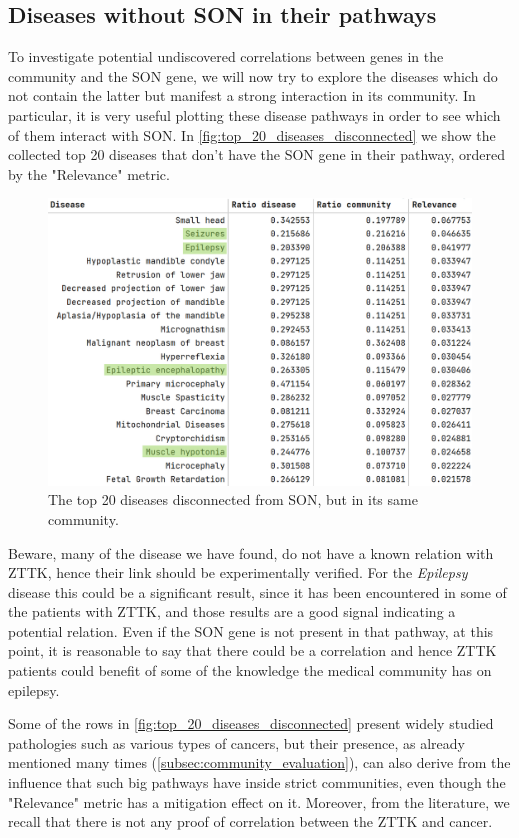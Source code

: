 \subsection{Diseases without SON in their pathways}\label{subsec:diseases_no_son}
To investigate potential undiscovered correlations between genes in the community and the SON gene, we will now try to explore the diseases which do not contain the latter but manifest a strong interaction in its community. In particular, it is very useful plotting these disease pathways in order to see which of them interact with SON. In \autoref{fig:top_20_diseases_disconnected} we show the collected top 20 diseases that don't have the SON gene in their pathway, ordered by the "Relevance" metric.
\begin{figure}[H]
    \centering
    \includegraphics[width=0.8\linewidth]{images/top20_diseases_disconnected_highlighted.png}
    \caption{The top 20 diseases disconnected from SON, but in its same community.}
    \label{fig:top_20_diseases_disconnected}
\end{figure}
Beware, many of the disease we have found, do not have a known relation with ZTTK, hence their link should be experimentally verified. For the \textit{Epilepsy} disease this could be a significant result, since it has been encountered in some of the patients with ZTTK, and those results are a good signal indicating a potential relation. Even if the SON gene is not present in that pathway, at this point, it is reasonable to say that there could be a correlation and hence ZTTK patients could benefit of some of the knowledge the medical community has on epilepsy.
\vspace{3mm}

Some of the rows in \autoref{fig:top_20_diseases_disconnected} present widely studied pathologies such as various types of cancers, but their presence, as already mentioned many times (\autoref{subsec:community_evaluation}), can also derive from the influence that such big pathways have inside strict communities, even though the "Relevance" metric has a mitigation effect on it. Moreover, from the literature, we recall that there is not any proof of correlation between the ZTTK and cancer.
\vspace{3mm}

